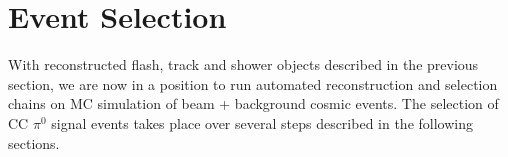 \documentclass[12pt]{article}
\begin{document}



\newpage
\section {Event Selection}
With reconstructed flash, track and shower objects described in the previous section, we are now in a position to run automated reconstruction and selection chains on MC simulation of beam + background cosmic events. The selection of CC $\pi^0$ signal events takes place over several steps described in the following sections.
\end{document}
